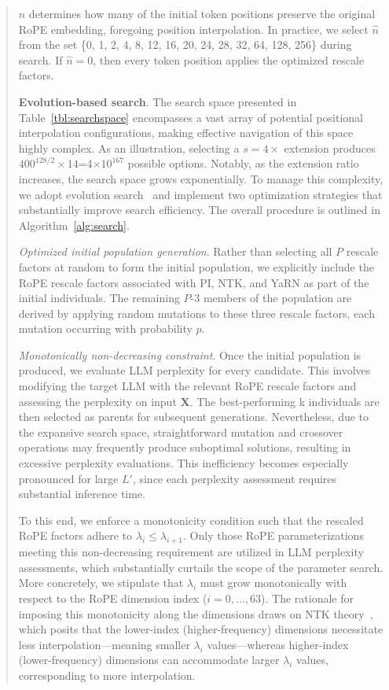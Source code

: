 \begin{abstract}
$\hat{n}$ determines how many of the initial token positions preserve the original RoPE embedding, foregoing position interpolation. In practice, we select $\hat{n}$ from the set \{0, 1, 2, 4, 8, 12, 16, 20, 24, 28, 32, 64, 128, 256\} during search. If $\hat{n}=0$, then every token position applies the optimized rescale factors.

\textbf{Evolution-based search}. The search space presented in Table~\ref{tbl:searchspace} encompasses a vast array of potential positional interpolation configurations, making effective navigation of this space highly complex. As an illustration, selecting a $s=4\times$ extension produces $400^{128/2}\times14$=4$\times10^{167}$ possible options. Notably, as the extension ratio increases, the search space grows exponentially. To manage this complexity, we adopt evolution search~\cite{guo2020single} and implement two optimization strategies that substantially improve search efficiency. The overall procedure is outlined in Algorithm~\ref{alg:search}.

\textit{Optimized initial population generation}. Rather than selecting all $P$ rescale factors at random to form the initial population, we explicitly include the RoPE rescale factors associated with PI, NTK, and YaRN as part of the initial individuals. The remaining $P$-3 members of the population are derived by applying random mutations to these three rescale factors, each mutation occurring with probability $p$.

\textit{Monotonically non-decreasing constraint}. Once the initial population is produced, we evaluate LLM perplexity for every candidate. This involves modifying the target LLM with the relevant RoPE rescale factors and assessing the perplexity on input $\mathbf{X}$. The best-performing k individuals are then selected as parents for subsequent generations. Nevertheless, due to the expansive search space, straightforward mutation and crossover operations may frequently produce suboptimal solutions, resulting in excessive perplexity evaluations. This inefficiency becomes especially pronounced for large $L'$, since each perplexity assessment requires substantial inference time.

To this end, we enforce a monotonicity condition such that the rescaled RoPE factors adhere to $\lambda_i \le \lambda_{i+1}$. Only those RoPE parameterizations meeting this non-decreasing requirement are utilized in LLM perplexity assessments, which substantially curtails the scope of the parameter search. More concretely, we stipulate that $\lambda_i$ must grow monotonically with respect to the RoPE dimension index ($i=0, ..., 63$). The rationale for imposing this monotonicity along the dimensions draws on NTK theory~\cite{jacot2018neural,tancik2020fourier,ntk}, which posits that the lower-index (higher-frequency) dimensions necessitate less interpolation—meaning smaller $\lambda_i$ values—whereas higher-index (lower-frequency) dimensions can accommodate larger $\lambda_i$ values, corresponding to more interpolation.


\end{abstract}
